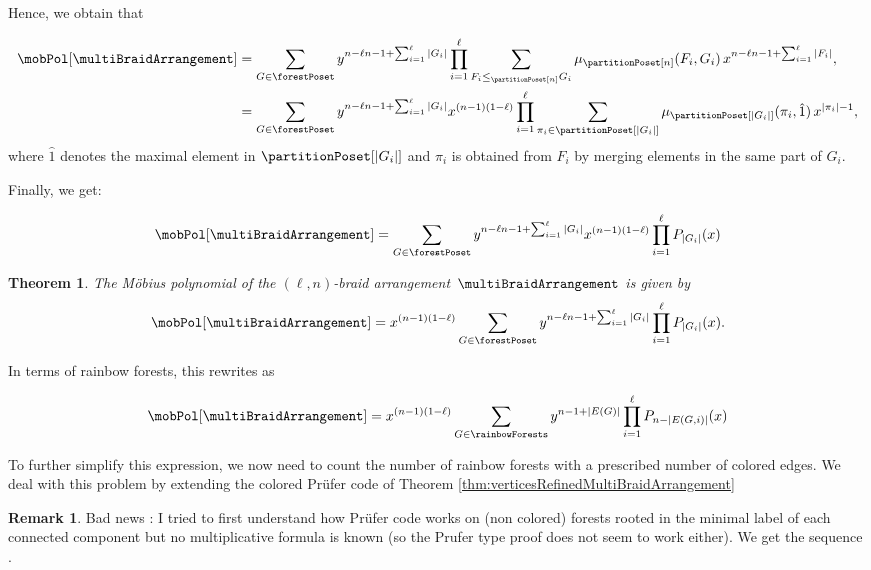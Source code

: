 \documentclass[11pt,leqno]{amsart}
\newcommand{\OEIS}[1]{\cite[{\rm \href{http://oeis.org/#1}{\texttt{#1}}}]{OEIS}}
\theoremstyle{definition}
\newtheorem{remark}[definition]{Remark}
\theoremstyle{plain}
\newtheorem{theorem}[definition]{Theorem}
\begin{document}
Hence, we obtain that

\begin{align*}
\mobPol[\multiBraidArrangement] &=\sum_{G \in \forestPoset} y^{n-\ell n - 1 + \sum_{i=1}^\ell |G_i|} \prod_{i=1}^{\ell} \sum_{F_i \leq_{\partitionPoset[n]} G_i } \mu_{\partitionPoset[n]}(F_i,G_i) \, x^{n-\ell n - 1 + \sum_{i=1}^\ell |F_i|}, \\
 &=\sum_{G \in \forestPoset} y^{n-\ell n - 1 + \sum_{i=1}^\ell |G_i|} x^{(n-1)(1-\ell)} \prod_{i=1}^{\ell} \sum_{\pi_i \in \partitionPoset[|G_i|]}  \mu_{\partitionPoset[|G_i|]}(\pi_i,\hat{1}) \, x^{|\pi_i|-1}, 
\end{align*}
where $\hat{1}$ denotes the maximal element in $\partitionPoset[|G_i|]$ and $\pi_i$ is obtained from $F_i$ by merging elements in the same part of $G_i$.

Finally, we get:

\begin{equation}
\mobPol[\multiBraidArrangement]=\sum_{G \in \forestPoset} y^{n-\ell n - 1 + \sum_{i=1}^\ell |G_i|} x^{(n-1)(1-\ell)} \prod_{i=1}^{\ell} P_{|G_i|}(x)
\end{equation}

\begin{theorem}
The M\"obius polynomial of the $(\ell,n)$-braid arrangement~$\multiBraidArrangement$ is given by
\[
\mobPol[\multiBraidArrangement]=x^{(n-1)(1-\ell)} \sum_{G \in \forestPoset} y^{n-\ell n - 1 + \sum_{i=1}^\ell |G_i|}  \prod_{i=1}^{\ell} P_{|G_i|}(x).
\]
\end{theorem}

In terms of rainbow forests, this rewrites as

\begin{equation}
\mobPol[\multiBraidArrangement]=x^{(n-1)(1-\ell)} \sum_{G \in \rainbowForests} y^{n- 1 + |E(G)|}  \prod_{i=1}^{\ell} P_{n-|E(G,i)|}(x)
\end{equation}

To further simplify this expression, we now need to count the number of rainbow forests with a prescribed number of colored edges. We deal with this problem by extending the colored Pr\"{u}fer code of Theorem \ref{thm:verticesRefinedMultiBraidArrangement}


\begin{remark}
Bad news : I tried to first understand  how Pr\"{u}fer code works on (non colored) forests rooted in the minimal label of each connected component but no multiplicative formula is known (so the Prufer type proof does not seem to work either).
We get the sequence \OEIS{A138464}.
\end{remark}





\label{sec:biblio}
\end{document}
